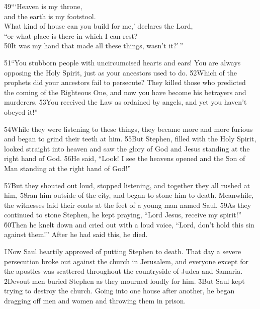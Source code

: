 \begin{poetry}
\poeml \v{49}```Heaven is my throne, \\
\poemll    and the earth is my footstool. \\
\poeml What kind of house can you build for me,' declares the Lord, \\
\poemll    ``or what place is there in which I can rest? \\
\poeml \v{50}It was my hand that made all these things, wasn't it?'\,''
\end{poetry}

\v{51}``You stubborn people with uncircumcised hearts and ears! You are always opposing the Holy Spirit, just as your ancestors used to do. \v{52}Which of the prophets did your ancestors fail to persecute? They killed those who predicted the coming of the Righteous One, and now you have become his betrayers and murderers. \v{53}You received the Law as ordained by angels, and yet you haven't obeyed it!''

\v{54}While they were listening to these things, they became more and more furious and began to grind their teeth at him. \v{55}But Stephen, filled with the Holy Spirit, looked straight into heaven and saw the glory of God and Jesus standing at the right hand of God. \v{56}He said, ``Look! I see the heavens opened and the Son of Man standing at the right hand of God!''

\v{57}But they shouted out loud, stopped listening, and together they all rushed at him, \v{58}ran him outside of the city, and began to stone him to death. Meanwhile, the witnesses laid their coats at the feet of a young man named Saul. \v{59}As they continued to stone Stephen, he kept praying, ``Lord Jesus, receive my spirit!'' \v{60}Then he knelt down and cried out with a loud voice, ``Lord, don't hold this sin against them!'' After he had said this, he died.

\v{1}Now Saul heartily approved of putting Stephen to death. That day a severe persecution broke out against the church in Jerusalem, and everyone except for the apostles was scattered throughout the countryside of Judea and Samaria. \v{2}Devout men buried Stephen as they mourned loudly for him. \v{3}But Saul kept trying to destroy the church. Going into one house after another, he began dragging off men and women and throwing them in prison.

